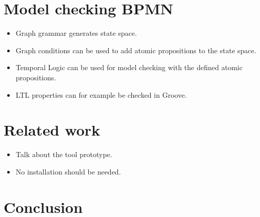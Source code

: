 \documentclass[adraft, copyright, creativecommons]{eptcs} %
\begin{document}
\section{Model checking BPMN}
\begin{itemize}
    \item Graph grammar generates state space.
    \item Graph conditions can be used to add atomic propositions to the state space.
    \item Temporal Logic can be used for model checking with the defined atomic propositions.
    \item LTL properties can for example be checked in Groove.
\end{itemize}
\section{Related work}
\begin{itemize}
    \item Talk about the tool prototype.
    \item No installation should be needed.
\end{itemize}

\section{Conclusion}


\end{document}
